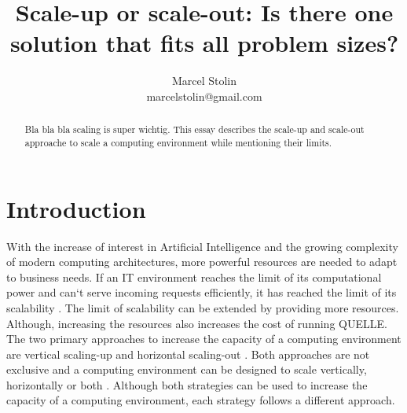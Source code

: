 \documentclass{article}
\title{Scale-up or scale-out: Is there one solution that fits all problem sizes?}
\date{}
\author{Marcel Stolin \\ marcelstolin@gmail.com}
\begin{document}
\maketitle


\begin{abstract}
Bla bla bla scaling is super wichtig.
This essay describes the scale-up and scale-out approache to scale a computing environment while mentioning their limits. 
\end{abstract}


\section{Introduction} \label{s_intro}
With the increase of interest in Artificial Intelligence and the growing complexity of modern computing architectures, more powerful resources are needed to adapt to business needs. If an IT environment reaches the limit of its computational power and can`t serve incoming requests efficiently, it has reached the limit of its scalability \cite{Wilder2012CloudPatterns}. The limit of scalability can be extended by providing more resources. Although, increasing the resources also increases the cost of running QUELLE.
The two primary approaches to increase the capacity of a computing environment are vertical scaling-up and horizontal scaling-out \cite{Abbott2015ScalabilityArt}. Both approaches are not exclusive and a computing environment can be designed to scale vertically, horizontally or both \cite{Wilder2012CloudPatterns}.
Although both strategies can be used to increase the capacity of a computing environment, each strategy follows a different approach.
\end{document}
